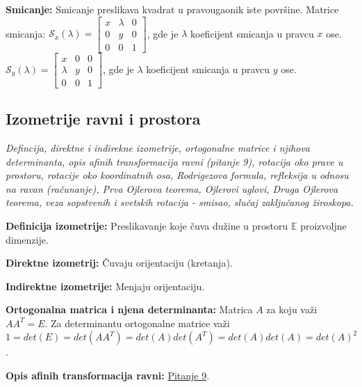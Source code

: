 \documentclass[12pt]{article}
\begin{document}
\textbf{Smicanje:} Smicanje preslikava kvadrat u pravougaonik iste površine.
Matrice smicanja:
$\mathcal{S}_x(\lambda)=\begin{bmatrix}
        x & \lambda & 0 \\
        0 & y       & 0 \\
        0 & 0       & 1
    \end{bmatrix}$, gde je $\lambda$ koeficijent smicanja u pravcu $x$ ose.\\
$\mathcal{S}_y(\lambda)=\begin{bmatrix}
        x       & 0 & 0 \\
        \lambda & y & 0 \\
        0       & 0 & 1
    \end{bmatrix}$, gde je $\lambda$ koeficijent smicanja u pravcu $y$ ose.

\subsection{Izometrije ravni i prostora}
\textit{Defincija, direktne i indirekne izometrije, ortogonalne matrice i
    njihova determinanta, opis afinih transformacija ravni (pitanje 9), rotacija
    oko prave u prostoru, rotacije oko koordinatnih osa, Rodrigezova formula,
    refleksija u odnosu na ravan (računanje), Prva Ojlerova teorema, Ojlerovi
    uglovi, Druga Ojlerova teorema, veza sopstvenih i svetskih rotacija - smisao,
    slučaj zaključanog žiroskopa.}
\par
\vspace*{1cm}

\textbf{Definicija izometrije:} Preslikavanje koje čuva dužine u prostoru
$\mathbb{E}$ proizvoljne dimenzije.
\par

\textbf{Direktne izometrij:} Čuvaju orijentaciju (kretanja).
\par

\textbf{Indirektne izometrije:} Menjaju orijentaciju.
\par

\textbf{Ortogonalna matrica i njena determinanta:} Matrica $A$ za koju važi
$AA^T=E$. Za determinantu ortogonalne matrice važi
$1=det(E)=det(AA^T)=det(A)det(A^T)=det(A)det(A)=det(A)^2$.
\par

\textbf{Opis afinih transformacija ravni:} \hyperref[subsec:pitanje_9]{Pitanje 9}.
\par
\end{document}

